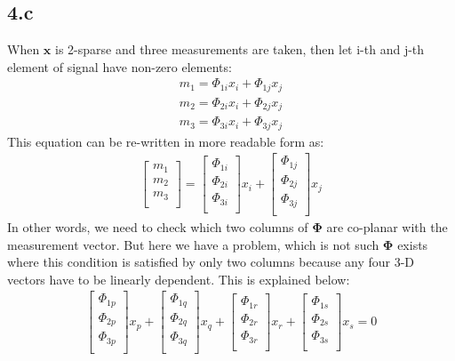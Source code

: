 \documentclass[12pt]{article}
\begin{document}
\subsection*{4.c}
When $\boldsymbol{x}$ is 2-sparse and three measurements are taken, then let i-th and j-th element of signal have non-zero elements:
\begin{align*}
    m_1 = \Phi_{1i}x_i+\Phi_{1j}x_j\\
    m_2 = \Phi_{2i}x_i+\Phi_{2j}x_j\\
    m_3 = \Phi_{3i}x_i+\Phi_{3j}x_j
\end{align*}
This equation can be re-written in more readable form as:
\begin{align*}
    \begin{bmatrix} 
    m_1 \\
    m_2 \\
    m_3 \\
    \end{bmatrix} =
    \begin{bmatrix} 
    \Phi_{1i} \\
    \Phi_{2i} \\
    \Phi_{3i} \\
    \end{bmatrix}x_i +
    \begin{bmatrix} 
    \Phi_{1j} \\
    \Phi_{2j} \\
    \Phi_{3j} \\
    \end{bmatrix}x_j
\end{align*}
In other words, we need to check which two columns of $\boldsymbol{\Phi}$ are co-planar with the measurement vector. But here we have a problem, which is not such $\boldsymbol{\Phi}$ exists where this condition is satisfied by only two columns because any four 3-D vectors have to be linearly dependent. This is explained below:
\begin{align*}
    \begin{bmatrix} 
    \Phi_{1p} \\
    \Phi_{2p} \\
    \Phi_{3p} \\
    \end{bmatrix}x_p +
    \begin{bmatrix} 
    \Phi_{1q} \\
    \Phi_{2q} \\
    \Phi_{3q} \\
    \end{bmatrix}x_q +
    \begin{bmatrix} 
    \Phi_{1r} \\
    \Phi_{2r} \\
    \Phi_{3r} \\
    \end{bmatrix}x_r +
    \begin{bmatrix} 
    \Phi_{1s} \\
    \Phi_{2s} \\
    \Phi_{3s} \\
    \end{bmatrix}x_s = 0
\end{align*}
\end{document}
